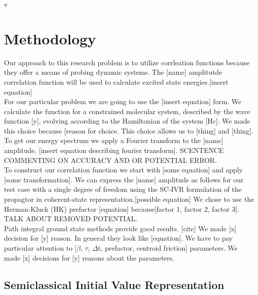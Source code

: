 \documentclass[12pt,letterpaper,oneside]{article}               %
\begin{document}
\newpage v

\section{Methodology}

Our approach to this research problem is to utilize corrleation functions because they offer a means of probing dynamic systems. The [name] amplitutde correlation function will be used to calculate excited state energies.[insert equation]\\
For our particular problem we are going to use the [insert equation] form. We calculate the function for a constrained molecular system, described by the wave function [y], evolving according to the Hamiltonian of the system [Hc]. We made this choice because [reason for choice. This choice allows us to [thing] and [thing]. \\
To get our energy spectrum we apply a Fourier transform to the [name] amplitude. [insert equation describing fourier transform]. SCENTENCE COMMENTING ON ACCURACY AND OR POTENTIAL ERROR. \\

To construct our correlation function we start with [some equation] and apply [some transformation]. We can express the [name] amplitude as follows for our test case with a single degree of freedom using the SC-IVR formulation of the propagtor in coherent-state representation.[possible equation] We chose to use the Herman-Kluck (HK) prefactor [equation] because[factor 1, factor 2, factor 3].~\cite{kay2006herman} TALK ABOUT REMOVED POTENTIAL. \\

Path integral ground state methods provide good results. [cite] We made [x] decision for [y] reason. In general they look like [equation]. We have to pay particular attention to [$\beta$, $\tau$, $\Delta$t, prefactor, centroid friction] parameters. We made [x] decisions for [y] reasons about the parameters.

\subsection*{Semiclassical Initial Value Representation}
\end{document}
